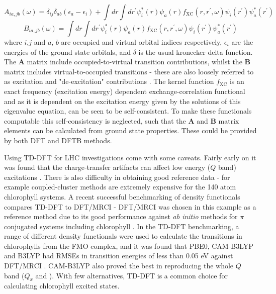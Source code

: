\begin{equation}
A_{ia,jb}\left(\omega\right) = \delta_{ij}\delta_{ab}\left(\epsilon_a - \epsilon_i\right) + \int dr \int dr^\prime \psi_i^*\left(r\right) \psi_a\left(r\right) f_{\text{XC}}\left(r, r^\prime, \omega\right) \psi_i\left(r^\prime\right) \psi_a^*\left(r^\prime\right)
\end{equation}
%
\begin{equation}
B_{ia,jb}\left(\omega\right) = \int dr \int dr^\prime \psi_i^*\left(r\right) \psi_a\left(r\right) f_{\text{XC}}\left(r, r^\prime, \omega\right) \psi_i\left(r^\prime\right) \psi_a^*\left(r^\prime\right)
\end{equation}
%
where $i$,$j$ and $a$, $b$ are occupied and virtual orbital indices respectively, $\epsilon_i$
are the energies of the ground state orbitals, and $\delta$ is the usual kronecker 
delta function. The $\mathbf{A}$ matrix include occupied-to-virtual transition contributions,
whilst the $\mathbf{B}$ matrix includes virtual-to-occupied transitions - these 
are also loosely referred to as excitation and "de-excitation" contributions \cite{Casida2012}.  
The kernel function $f_{\text{XC}}$ is an exact frequency (excitation energy) 
dependent exchange-correlation functional and as it is dependent on the excitation 
energy given by the solutions of this eigenvalue equation, can be seen to be self-consistent.
To make these functionals computable this self-consistency is neglected, such that
the $\mathbf{A}$ and $\mathbf{B}$ matrix elements can be calculated from ground
state properties. These could be provided by both DFT and DFTB methods.

Using TD-DFT for LHC investigations come with some caveats. Fairly early on it was 
found that the charge-transfer artifacts can affect low energy ($Q$ band) excitations
\cite{Dahlbom2005}. There is also difficulty in obtaining good reference data - 
for example coupled-cluster methods are extremely expensive for the 140 atom chlorophyll
systems. A recent successful benchmarking of density functionals compares TD-DFT
to DFT/MRCI - DFT/MRCI was chosen in this example as a reference method due to its
good performance against \emph{ab initio} methods for $\pi$ conjugated systems including
chlorophyll \cite{Marian2008, Perun2008, Etinski2011, Parusel2000}. In the TD-DFT
benchmarking, a range of different density functionals were used to calculate the
\Qy transitions in chlorophylls from the FMO complex, and it was found that PBE0,
CAM-B3LYP and B3LYP had RMSEs in transition energies of less than 0.05 eV against 
DFT/MRCI \cite{List2013}. CAM-B3LYP also proved the best in reproducing the whole
$Q$ band ($Q_x$ and \Qy). With few alternatives, TD-DFT is a common choice for calculating
chlorophyll excited states.

